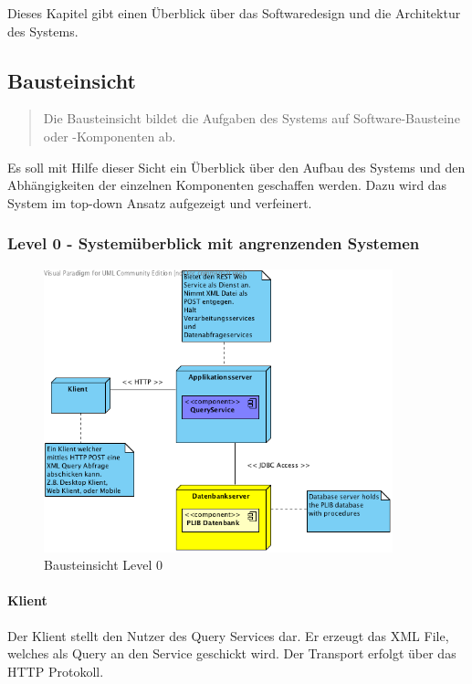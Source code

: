 Dieses Kapitel gibt einen Überblick über das Softwaredesign und die Architektur des Systems. 

\subsection{Bausteinsicht}
\begin{quotation}
Die Bausteinsicht bildet die Aufgaben des Systems auf Software-Bausteine oder -Komponenten ab.
 \citep[S. 98ff][]{starke}	
\end{quotation}

Es soll mit Hilfe dieser Sicht ein Überblick über den Aufbau des Systems und den Abhängigkeiten der einzelnen Komponenten geschaffen werden. Dazu wird das System im top-down Ansatz aufgezeigt und verfeinert. 

\subsubsection{Level 0 - Systemüberblick mit angrenzenden Systemen} 

\begin{figure}[htbp]
	\centering
		\includegraphics[width=0.9\textwidth]{images/bausteinsicht_plib_level0.png}
	\caption{Bausteinsicht Level 0}
	\label{fig:bausteinsicht_level0}
\end{figure}

\paragraph{Klient}

Der Klient stellt den Nutzer des Query Services dar. Er erzeugt das XML File, welches als Query an den Service geschickt wird. Der Transport erfolgt über das HTTP Protokoll.  

